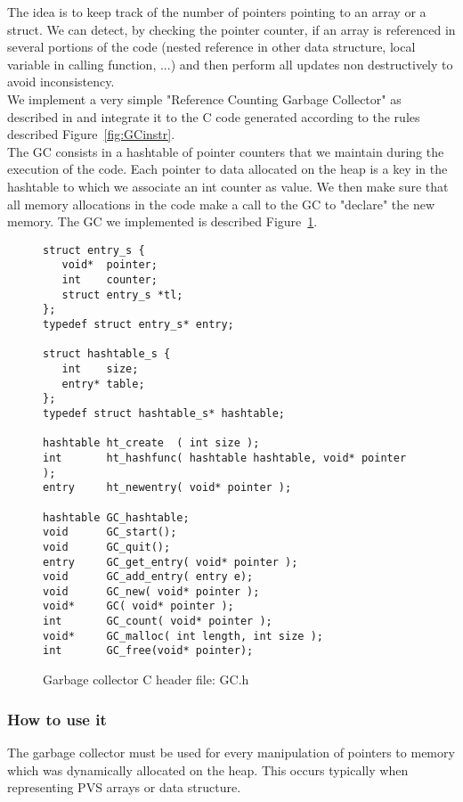 \documentclass[12pt,a4paper]{article}
\begin{document}
The idea is to keep track of the number of pointers pointing to an array or a struct. We can detect, by checking the pointer counter, if an array is referenced in several portions of the code (nested reference in other data structure, local variable in calling function, ...) and then perform all updates non destructively to avoid inconsistency.\\

We implement a very simple "Reference Counting Garbage Collector" as described in \cite{jonesgarbage} and integrate it to the C code generated according to the rules described Figure~\ref{fig:GCinstr}. \\

The GC consists in a hashtable of pointer counters that we maintain during the execution of the code. Each pointer to data allocated on the heap is a key in the hashtable to which we associate an int counter as value. We then make sure that all memory allocations in the code make a call to the GC to "declare" the new memory. The GC we implemented is described Figure~\ref{fig:GC.h}.



\begin{figure}[!ht]
\begin{lstlisting}
struct entry_s {
   void*  pointer;
   int    counter;
   struct entry_s *tl;
};
typedef struct entry_s* entry;

struct hashtable_s {
   int    size;
   entry* table;	
}; 
typedef struct hashtable_s* hashtable;

hashtable ht_create  ( int size );
int       ht_hashfunc( hashtable hashtable, void* pointer );
entry     ht_newentry( void* pointer );

hashtable GC_hashtable;
void      GC_start();
void      GC_quit();
entry     GC_get_entry( void* pointer );
void      GC_add_entry( entry e);
void      GC_new( void* pointer );
void*     GC( void* pointer );
int       GC_count( void* pointer );
void*     GC_malloc( int length, int size );
int       GC_free(void* pointer);
\end{lstlisting}
\caption{Garbage collector C header file: GC.h}
\label{fig:GC.h}
\end{figure}



\subsubsection{How to use it}

The garbage collector must be used for every manipulation of pointers to memory which was dynamically allocated on the heap. This occurs typically when representing PVS arrays or data structure. \\
\end{document}

